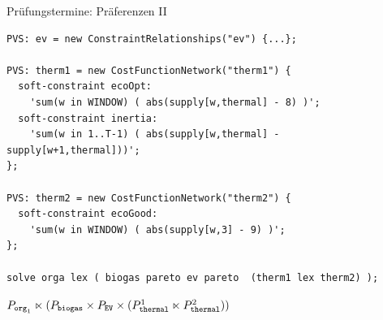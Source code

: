 \begin{frame}[fragile]{Prüfungstermine: Präferenzen II} \small

\begin{lstlisting}
PVS: ev = new ConstraintRelationships("ev") {...}; 

PVS: therm1 = new CostFunctionNetwork("therm1") {
  soft-constraint ecoOpt: 
    'sum(w in WINDOW) ( abs(supply[w,thermal] - 8) )';
  soft-constraint inertia: 
    'sum(w in 1..T-1) ( abs(supply[w,thermal] - supply[w+1,thermal]))';
};

PVS: therm2 = new CostFunctionNetwork("therm2") {
  soft-constraint ecoGood: 
    'sum(w in WINDOW) ( abs(supply[w,3] - 9) )';
};

solve orga lex ( biogas pareto ev pareto  (therm1 lex therm2) );
\end{lstlisting}
$P_{\mathtt{org}_1} \ltimes (P_{\mathtt{biogas}} \times P_{\mathtt{EV}} \times (P_{\mathtt{thermal}}^1 \ltimes P_{\mathtt{thermal}}^2))$
\end{frame}
